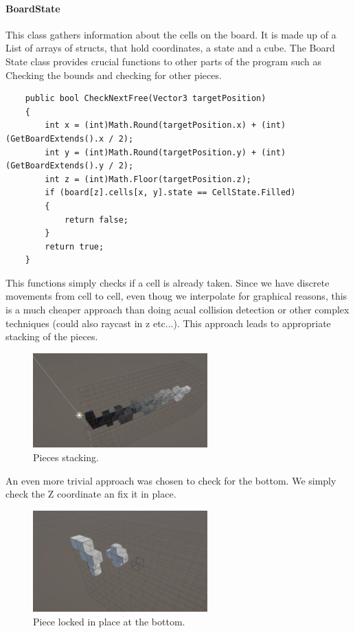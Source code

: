 \documentclass{article}
\begin{document}
\paragraph{BoardState}
This class gathers information about the cells on the board. It is made up of a List of arrays of structs, that hold coordinates, a state and a cube. The Board State class provides crucial functions to other parts of the program such as Checking the bounds and checking for other pieces.
\begin{verbatim}
    public bool CheckNextFree(Vector3 targetPosition)
    {
        int x = (int)Math.Round(targetPosition.x) + (int)(GetBoardExtends().x / 2);
        int y = (int)Math.Round(targetPosition.y) + (int)(GetBoardExtends().y / 2);
        int z = (int)Math.Floor(targetPosition.z);
        if (board[z].cells[x, y].state == CellState.Filled)
        {
            return false;
        }
        return true;
    }
\end{verbatim}
This functions simply checks if a cell is already taken. Since we have discrete movements from cell to cell, even thoug we interpolate for graphical reasons, this is a much cheaper approach than doing acual collision detection or other complex techniques (could also raycast in z etc...).
This approach leads to appropriate stacking of the pieces.
\begin{figure}
    \centering
    \includegraphics[width=0.6\textwidth]{./Dev/pieces piling up.png}
    \caption{Pieces stacking.}
    \label{fig:board}
\end{figure}
An even more trivial approach was chosen to check for the bottom. We simply check the Z coordinate an fix it in place.
\begin{figure}
    \label{fig:bottom}
    \centering
    \includegraphics[width=0.6\textwidth]{./Dev/bottom working.png}
    \caption{Piece locked in place at the bottom.}
\end{figure}
\end{document}

